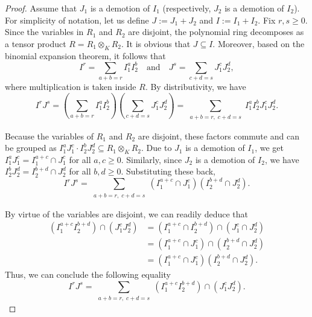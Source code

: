 \documentclass[11pt]{amsart}
\begin{document}
\begin{proof}
Assume that   $J_1$ is  a demotion of $I_1$ (respectively,  $J_2$ is  a demotion of $I_2$). For simplicity of notation, let us define $J := J_1 + J_2$ 
and $I := I_1 + I_2$.  Fix $r,s\geq 0$.  Since the variables in \(R_1\) and \(R_2\) are disjoint, the polynomial
 ring decomposes as a tensor product $R = R_1 \otimes_K R_2.$ It is obvious that $J \subseteq I$. 
 Moreover, based on the binomial expansion theorem,  it follows that
\[
I^r = \sum_{a+b=r} I_1^a I_2^b \quad \text{and}  \quad J^s = \sum_{c+d=s} J_1^c J_2^d,
\]
where multiplication is taken inside \(R\).  By distributivity, we have 
\[
I^r J^s = \left( \sum_{a+b=r} I_1^a I_2^b \right) \left( \sum_{c+d=s} J_1^c J_2^d \right) = \sum_{\substack{a+b=r, \; c+d=s}} I_1^a I_2^b J_1^c J_2^d.
\]

Because the variables of \(R_1\) and \(R_2\) are disjoint, these factors commute and can be grouped as $I_1^a J_1^c \cdot I_2^b J_2^d \subseteq R_1 \otimes_K R_2.$
Due to  \(J_1\) is a demotion of \(I_1\), we get $I_1^a J_1^c = I_1^{a+c} \cap J_1^c$ for all \(a, c \geq 0\). Similarly, since \(J_2\) is a demotion of \(I_2\), we have
$I_2^b J_2^d = I_2^{b+d} \cap J_2^d$ for all \(b, d \geq 0\). Substituting these back,  
\[
I^r J^s = \sum_{\substack{a+b=r, \; c+d=s}} (I_1^{a+c} \cap J_1^c)(I_2^{b+d} \cap J_2^d).
\]

By virtue of  the variables are disjoint, we can readily deduce that 
 \begin{align*}
  (I_1^{a+c} I_2^{b+d}) \cap (J_1^c J_2^d) &=   (I_1^{a+c} \cap  I_2^{b+d}) \cap (J_1^c \cap  J_2^d)\\
 &= (I_1^{a+c} \cap J_1^c) \cap ( I_2^{b+d} \cap  J_2^d)\\
 &= (I_1^{a+c} \cap J_1^c) ( I_2^{b+d} \cap  J_2^d).
 \end{align*}
Thus, we can conclude the following equality 
\[
I^r J^s = \sum_{\substack{a+b=r,\; c+d=s}} (I_1^{a+c} I_2^{b+d}) \cap (J_1^c J_2^d).
\]


\end{proof}
\end{document}
